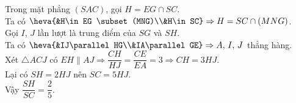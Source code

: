 \begin{ex}
{		Trong mặt phẳng $(SAC)$, gọi  $H=EG\cap SC$.\\
		Ta có $\heva{&H\in EG \subset(MNG)\\&H\in SC}\Rightarrow H=SC \cap(MNG)$.\\ 
		Gọi $I$, $J$ lần lượt là trung  điểm của $SG$ và $SH$.\\
		Ta có $\heva{&IJ\parallel  HG\\&IA\parallel GE}\Rightarrow A,\,I,\,J$ thẳng hàng.\\
		Xét $\triangle ACJ$  có $EH\parallel AJ\Rightarrow \dfrac{CH}{HJ}=\dfrac{CE}{EA}=3\Rightarrow CH=3HJ$.\\
		Lại có  $SH=2HJ$ nên $SC=5HJ$.\\
		 Vậy $\dfrac{SH}{SC}=\dfrac{2}{5}$.
	} 
\end{ex}

